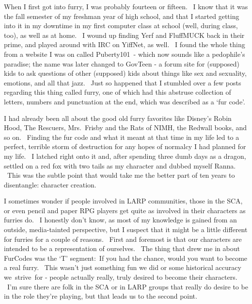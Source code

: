 When I first got into furry, I was probably fourteen or fifteen. ~I know
that it was the fall semester of my freshman year of high school, and
that I started getting into it in my downtime in my first computer class
at school (well, during class, too), as well as at home. ~I wound up
finding Yerf and FluffMUCK back in their prime, and played around with
IRC on YiffNet, as well. ~I found the whole thing from a website I was
on called Puberty101~- which now sounds like a pedophile's paradise; the
name was later changed to GovTeen - a forum site for (supposed) kids to
ask questions of other (supposed) kids about things like sex and
sexuality, emotions, and all that jazz. ~Just so happened that I
stumbled over a few posts regarding this thing called furry, one of
which had this abstruse collection of letters, numbers and punctuation
at the end, which was described as a `fur code'.

I had already been all about the good old furry favorites like Disney's
Robin Hood, The Rescuers, Mrs.~Frisby and the Rats of NIMH, the Redwall
books, and so on. ~Finding the fur code and what it meant at that time
in my life led to a perfect, terrible storm of destruction for any hopes
of normalcy I had planned for my life. ~I latched right onto it and,
after spending three dumb days as a dragon, settled on a red fox with
two tails as my character and dubbed myself Ranna. ~This was the subtle
point that would take me the better part of ten years to disentangle:
character creation.

I sometimes wonder if people involved in LARP communities, those in the
SCA, or even pencil and paper RPG players get quite as involved in their
characters as furries do. ~I honestly don't know, as most of my
knowledge is gained from an outside, media-tainted perspective, but I
suspect that it might be a little different for furries for a couple of
reasons. ~First and foremost is that our characters are intended to be a
representation of ourselves. ~The thing that drew me in about FurCodes
was the `T' segment:~If you had the chance, would you want to become a
real furry. ~This wasn't just something fun we did or some historical
accuracy we~strive~for - people actually really, truly desired to become
their characters. ~I'm sure there are folk in the SCA or in LARP groups
that really do desire to be in the role they're playing, but that leads
us to the second point.

